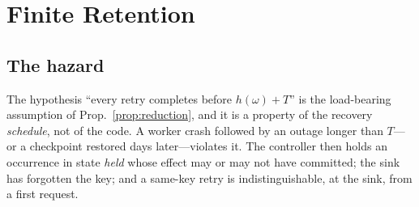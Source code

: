 \documentclass[conference,10pt]{IEEEtran}
\begin{document}
\section{Finite Retention}

\subsection{The hazard}
The hypothesis ``every retry completes before $h(\omega)+T$'' is the load-bearing assumption of Prop.~\ref{prop:reduction}, and it is a property of the recovery \emph{schedule}, not of the code. A worker crash followed by an outage longer than $T$---or a checkpoint restored days later---violates it. The controller then holds an occurrence in state \emph{held} whose effect may or may not have committed; the sink has forgotten the key; and a same-key retry is indistinguishable, at the sink, from a first request.
\end{document}
